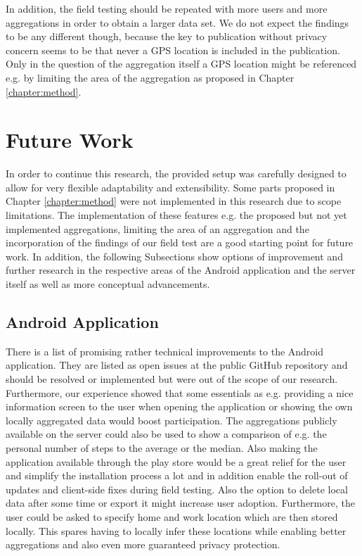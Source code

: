 In addition, the field testing should be repeated with more users and more aggregations in order to obtain a larger data set. We do not expect the findings to be any different though, because the key to publication without privacy concern seems to be that never a GPS location is included in the publication. Only in the question of the aggregation itself a GPS location might be referenced e.g. by limiting the area of the aggregation as proposed in Chapter \ref{chapter:method}.

\section{Future Work}
In order to continue this research, the provided setup was carefully designed to allow for very flexible adaptability and extensibility. Some parts proposed in Chapter \ref{chapter:method} were not implemented in this research due to scope limitations. The implementation of these features e.g. the proposed but not yet implemented aggregations, limiting the area of an aggregation and the incorporation of the findings of our field test are a good starting point for future work. In addition, the following Subsections show options of improvement and further research in the respective areas of the Android application and the server itself as well as more conceptual advancements.

\subsection{Android Application}\label{future-android}
There is a list of promising rather technical improvements to the Android application. They are listed as open issues at the public GitHub repository and should be resolved or implemented but were out of the scope of our research. Furthermore, our experience showed that some essentials as e.g. providing a nice information screen to the user when opening the application or showing the own locally aggregated data would boost participation. The aggregations publicly available on the server could also be used to show a comparison of e.g. the personal number of steps to the average or the median. Also making the application available through the play store would be a great relief for the user and simplify the installation process a lot and in addition enable the roll-out of updates and client-side fixes during field testing. Also the option to delete local data after some time or export it might increase user adoption. Furthermore, the user could be asked to specify home and work location which are then stored locally. This spares having to locally infer these locations while enabling better aggregations and also even more guaranteed privacy protection.

